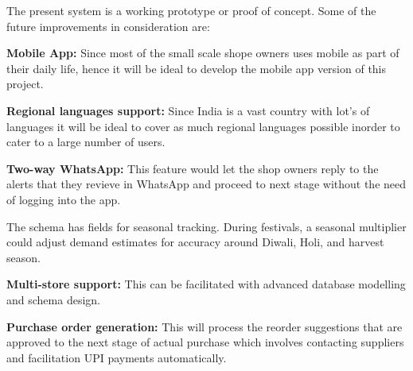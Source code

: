 \documentclass[journal]{IEEEtran}
\begin{document}
\label{sec:future}

The present system is a working prototype or proof of concept. Some of the future improvements in consideration are:

\textbf{Mobile App:} Since most of the small scale shope owners uses mobile as part of their daily life, hence it will be ideal to develop the mobile app version of this project.

\textbf{Regional languages support:} Since India is a vast country with lot's of languages it will be ideal to cover as much regional languages possible inorder to cater to a large number of users.

\textbf{Two-way WhatsApp:} This feature would let the shop owners reply to the alerts that they revieve in WhatsApp and proceed to next stage without the need of logging into the app. 

The schema has fields for seasonal tracking. During festivals, a seasonal multiplier could adjust demand estimates for accuracy around Diwali, Holi, and harvest season.

\textbf{Multi-store support:} This can be facilitated with advanced database modelling and schema design.

\textbf{Purchase order generation:} This will process the reorder suggestions that are approved to the next stage of actual purchase which involves contacting suppliers and facilitation UPI payments automatically.
\end{document}

